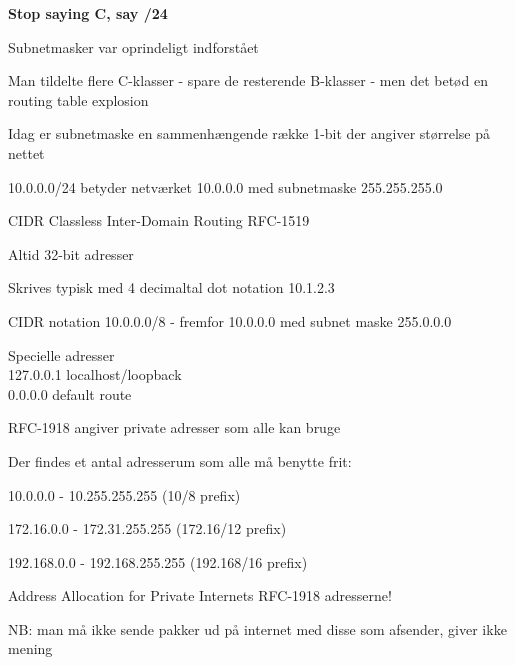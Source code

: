 \documentclass[Screen16to9,17pt]{foils}
\begin{document}
\vskip 5mm
\centerline{\bf Stop saying C, say /24}



\begin{list1}
\item Subnetmasker var oprindeligt indforstået
\item Man tildelte flere C-klasser - spare de resterende B-klasser - men det betød en routing table explosion
\item Idag er subnetmaske en sammenhængende række 1-bit der angiver størrelse på nettet
\item 10.0.0.0/24 betyder netværket 10.0.0.0 med subnetmaske 255.255.255.0
\item CIDR Classless Inter-Domain Routing RFC-1519
\end{list1}



\begin{list2}
\item Altid 32-bit adresser
\item Skrives typisk med 4 decimaltal dot notation 10.1.2.3
\item CIDR notation 10.0.0.0/8 -
  fremfor 10.0.0.0 med subnet maske 255.0.0.0
\item Specielle adresser\\
127.0.0.1 localhost/loopback\\
0.0.0.0  default route
\item RFC-1918 angiver private adresser som alle kan bruge
\end{list2}


\begin{list1}
\item Der findes et antal adresserum som alle må benytte frit:
\begin{list2}
\item 10.0.0.0    -  10.255.255.255  (10/8 prefix)
\item 172.16.0.0  -  172.31.255.255  (172.16/12 prefix)
\item 192.168.0.0 -  192.168.255.255 (192.168/16 prefix)
\end{list2}
\item Address Allocation for Private Internets RFC-1918 adresserne!
\item NB: man må ikke sende pakker ud på internet med disse som afsender, giver ikke mening
\end{list1}
\end{document}
